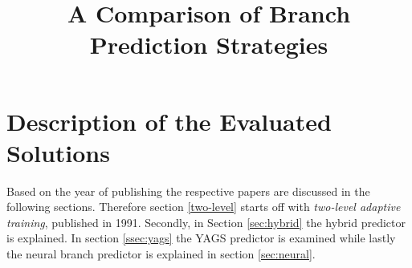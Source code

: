 \documentclass[conference]{IEEEtran}
\begin{document}
%
\title{A Comparison of Branch Prediction Strategies}


\author{
}


\maketitle



\IEEEpeerreviewmaketitle




\section{Description of the Evaluated Solutions}
Based on the year of publishing the respective papers are discussed in the following sections.
Therefore section \ref{two-level} starts off with \textit{two-level adaptive training}, published in 1991.
Secondly, in Section \ref{sec:hybrid} the hybrid predictor is explained. In section \ref{ssec:yags} the YAGS predictor is examined while lastly the neural branch predictor is explained in section \ref{sec:neural}.
\end{document}
